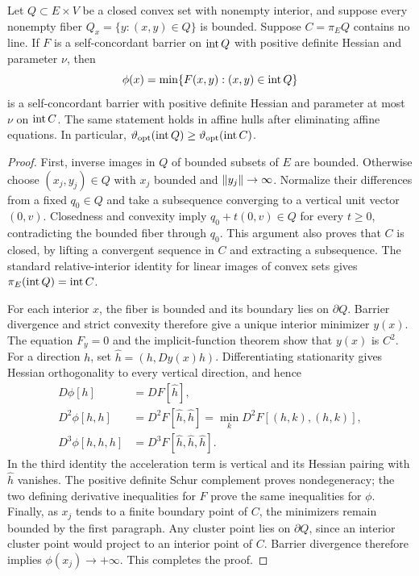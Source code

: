 \begin{lemma}
\label{lem:bounded-fiber-barrier}
Let $Q\subset E\times V$ be a closed convex set with nonempty interior,
and suppose every nonempty fiber $Q_x=\{y:(x,y)\in Q\}$ is bounded.
Suppose $C=\pi_E Q$ contains no line.  If $F$ is a self-concordant
barrier on $\operatorname{int} Q$ with positive definite Hessian and parameter $\nu$,
then
\[
 \phi(x)=\min\{F(x,y):(x,y)\in\operatorname{int} Q\}
\]
is a self-concordant barrier with positive definite Hessian and
parameter at most $\nu$ on $\operatorname{int} C$.  The same statement holds in
affine hulls after eliminating affine equations.  In particular,
$\vartheta_{\mathrm{opt}}(\operatorname{int} Q)
\geq\vartheta_{\mathrm{opt}}(\operatorname{int} C)$.
\end{lemma}
\begin{proof}
First, inverse images in $Q$ of bounded subsets of $E$ are bounded.
Otherwise choose $(x_j,y_j)\in Q$ with $x_j$ bounded and
$\lVert y_j\rVert\to\infty$.  Normalize their differences from a fixed
$q_0\in Q$ and take a subsequence converging to a vertical unit
vector $(0,v)$.  Closedness and convexity imply
$q_0+t(0,v)\in Q$ for every $t\geq0$, contradicting the bounded
fiber through $q_0$.  This argument also proves that $C$ is closed,
by lifting a convergent sequence in $C$ and extracting a subsequence.
The standard relative-interior identity for linear images of convex
sets gives $\pi_E(\operatorname{int} Q)=\operatorname{int} C$.

For each interior $x$, the fiber is bounded and its boundary lies
on $\partial Q$.  Barrier divergence and strict convexity therefore
give a unique interior minimizer $y(x)$.  The equation $F_y=0$
and the implicit-function theorem show that $y(x)$ is $C^2$.
For a direction $h$, set $\widehat h=(h,Dy(x)h)$.  Differentiating
stationarity gives Hessian orthogonality to every vertical direction,
and hence
\begin{align*}
 D\phi[h]&=DF[\widehat h],\\
 D^2\phi[h,h]&=D^2F[\widehat h,\widehat h]
                 =\min_kD^2F[(h,k),(h,k)],\\
 D^3\phi[h,h,h]&=D^3F[\widehat h,\widehat h,\widehat h].
\end{align*}
In the third identity the acceleration term is vertical and its
Hessian pairing with $\widehat h$ vanishes.  The positive definite
Schur complement proves nondegeneracy; the two defining derivative
inequalities for $F$ prove the same inequalities for $\phi$.
Finally, as $x_j$ tends to a finite boundary point of $C$, the
minimizers remain bounded by the first paragraph.  Any cluster point
lies on $\partial Q$, since an interior cluster point would project
to an interior point of $C$.  Barrier divergence therefore implies
$\phi(x_j)\to+\infty$.  This completes the proof.
\end{proof}

